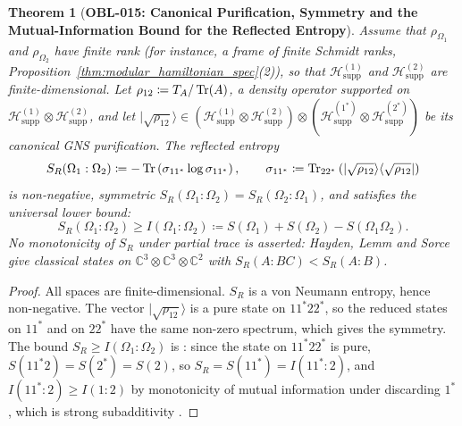 \documentclass[11pt,a4paper,reqno]{amsart}
\newtheorem{theorem}{Theorem}[section]
\theoremstyle{definition}
\theoremstyle{remark}
\numberwithin{equation}{section}
\begin{document}
\begin{theorem}[\textbf{OBL-015: Canonical Purification, Symmetry and the Mutual-Information Bound for the Reflected Entropy}]
\label{thm:reflected_entropy_prop}
Assume that $\rho_{\Omega_1}$ and $\rho_{\Omega_2}$ have finite rank (for instance, a frame of finite Schmidt ranks, Proposition~\ref{thm:modular_hamiltonian_spec}(2)), so that $\mathcal{H}_{\mathrm{supp}}^{(1)}$ and $\mathcal{H}_{\mathrm{supp}}^{(2)}$ are finite-dimensional. Let $\rho_{12} \coloneqq T_A/\Tr(A)$, a density operator supported on $\mathcal{H}_{\mathrm{supp}}^{(1)} \otimes \mathcal{H}_{\mathrm{supp}}^{(2)}$, and let $|\sqrt{\rho_{12}}\rangle \in (\mathcal{H}_{\mathrm{supp}}^{(1)} \otimes \mathcal{H}_{\mathrm{supp}}^{(2)}) \otimes (\mathcal{H}_{\mathrm{supp}}^{(1^*)} \otimes \mathcal{H}_{\mathrm{supp}}^{(2^*)})$ be its canonical GNS purification. The reflected entropy
\begin{equation}
S_R(\Omega_1 : \Omega_2) \coloneqq -\Tr\left( \sigma_{1 1^*} \log \sigma_{1 1^*} \right), \qquad \sigma_{1 1^*} \coloneqq \Tr_{2 2^*}\left( |\sqrt{\rho_{12}}\rangle \langle\sqrt{\rho_{12}}| \right)
\end{equation}
is non-negative, symmetric $S_R(\Omega_1 : \Omega_2) = S_R(\Omega_2 : \Omega_1)$, and satisfies the universal lower bound:
\begin{equation}
S_R(\Omega_1 : \Omega_2) \ge I(\Omega_1 : \Omega_2) \coloneqq S(\Omega_1) + S(\Omega_2) - S(\Omega_1 \Omega_2).
\end{equation}
No monotonicity of $S_R$ under partial trace is asserted: Hayden, Lemm and Sorce \cite[Thm.~1]{HaydenLemmSorce2023} give classical states on $\mathbb{C}^3\otimes\mathbb{C}^3\otimes\mathbb{C}^2$ with $S_R(A:BC) < S_R(A:B)$.
\end{theorem}

\begin{proof}
All spaces are finite-dimensional. $S_R$ is a von Neumann entropy, hence non-negative. The vector $|\sqrt{\rho_{12}}\rangle$ is a pure state on $11^*22^*$, so the reduced states on $11^*$ and on $22^*$ have the same non-zero spectrum, which gives the symmetry. The bound $S_R \ge I(\Omega_1 : \Omega_2)$ is \cite[eqs.~(2.12)--(2.14)]{DuttaFaulkner2019}: since the state on $11^*22^*$ is pure, $S(11^*2) = S(2^*) = S(2)$, so $S_R = S(11^*) = I(11^* : 2)$, and $I(11^*:2) \ge I(1:2)$ by monotonicity of mutual information under discarding $1^*$, which is strong subadditivity \cite{LiebRuskai1973}.
\end{proof}
\end{document}
